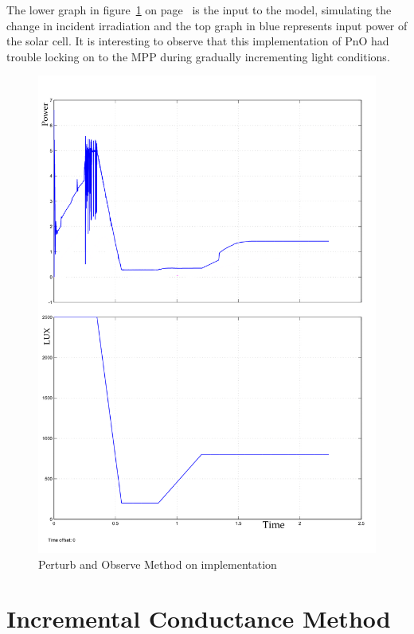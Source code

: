  The lower graph in figure~\ref{fig:PnO_result} on page~\pageref{fig:PnO_result} is the input to the model, simulating the change in incident irradiation and the top graph in blue represents input power of the solar cell. It is interesting to observe that this implementation of \ac{PnO} had trouble locking on to the \ac{MPP} during gradually incrementing light conditions.                       
  \begin{figure}[H]
	   \begin{center}
		   \includegraphics[width=\textwidth]{images/P&O_changing_lux-1}
		   \caption{Perturb and Observe Method on implementation   }
		   \label{fig:PnO_result}
	   \end{center}
   \end{figure}
   
 \section{Incremental Conductance Method }
 
